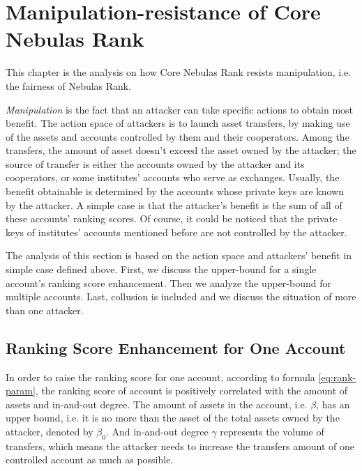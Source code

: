 
\section{Manipulation-resistance of Core Nebulas Rank}

This chapter is the analysis on how Core Nebulas Rank resists manipulation, i.e. the fairness of Nebulas Rank.

\emph{Manipulation} is the fact that an attacker can take specific actions to obtain most benefit. The action space of attackers is to launch asset transfers, by making use of the assets and accounts controlled by them and their cooperators. Among the transfers, the amount of asset doesn't exceed the asset owned by the attacker; the source of transfer is either the accounts owned by the attacker and its cooperators, or some institutes' accounts who serve as exchanges. Usually, the benefit obtainable is determined by the accounts whose private keys are known by the attacker. A simple case is that the attacker's benefit is the sum of all of these accounts' ranking scores. Of course, it could be noticed that the private keys of institutes' accounts mentioned before are not controlled by the attacker.

The analysis of this section is based on the action space and attackers' benefit in simple case defined above. First, we discuss the upper-bound for a single account's ranking score enhancement. Then we analyze the upper-bound for multiple accounts. Last, collusion is included and we discuss the situation of more than one attacker.

\subsection{Ranking Score Enhancement for One Account \label{sec:cheat-single}}

In order to raise the ranking score for one account, according to formula \ref{eq:rank-param}, the ranking score of account is positively correlated with the amount of assets and in-and-out degree. The amount of assets in the account, i.e. $\beta$, has an upper bound, i.e. it is no more than the asset of the total assets owned by the attacker, denoted by $\beta_0$. And in-and-out degree $\gamma$ represents the volume of transfers, which means the attacker needs to increase the transfers amount of one controlled account as much as possible.


